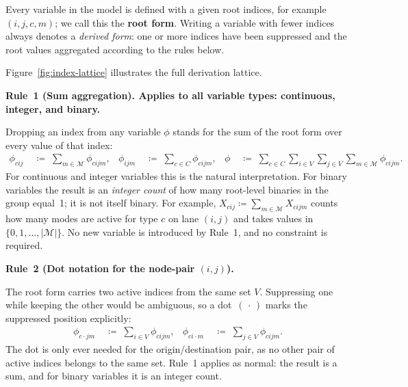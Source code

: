 \begin{convention}
\label{conv:notation}

Every variable in the model is defined with a given root indices, for example $(i,j,c,m)$; we call this the \textbf{root form}.
Writing a variable with fewer indices always denotes a
\emph{derived form}: one or more indices have been suppressed and
the root values aggregated according to the rules below.


Figure~\ref{fig:index-lattice} illustrates the full derivation
lattice.

\medskip
\noindent\textbf{Rule~1 (Sum aggregation).
  Applies to all variable types: continuous, integer, and binary.}

Dropping an index from any variable $\phi$ stands for the sum of
the root form over every value of that index:
%
\begin{align*}
  \phi_{cij}
    &\;\coloneqq\; \sum_{m\in\mathcal{M}} \phi_{cijm},
  &
  \phi_{ijm}
    &\;\coloneqq\; \sum_{c\in C}           \phi_{cijm},
  &
  \phi
    &\;\coloneqq\;
      \sum_{c\in C}\sum_{i\in V}\sum_{j\in V}\sum_{m\in\mathcal{M}} \phi_{cijm}.
\end{align*}
%
For continuous and integer variables this is the natural
interpretation.
For binary variables the result is an \emph{integer count} of how
many root-level binaries in the group equal~1; it is not itself
binary.
For example, $X_{cij} \coloneqq \sum_{m\in\mathcal{M}}
X_{cijm}$ counts how many modes are active for type $c$ on
lane $(i,j)$ and takes values in $\{0,1,\dots,|\mathcal{M}|\}$.
No new variable is introduced by Rule~1, and no constraint is
required.

\medskip
\noindent\textbf{Rule~2 (Dot notation for the node-pair $(i,j)$).}

The root form carries two active indices from the same set $V$.
Suppressing one while keeping the other would be ambiguous, so a
dot~$(\,\cdot\,)$ marks the suppressed position explicitly:
%
\begin{align*}
  \phi_{c\cdot j m}
    &\;\coloneqq\; \sum_{i\in V} \phi_{cijm},
  &
  \phi_{ci \cdot m}
    &\;\coloneqq\; \sum_{j\in V} \phi_{cijm}.
\end{align*}
%
The dot is only ever needed for the origin/destination pair, as no
other pair of active indices belongs to the same set.
Rule~1 applies as normal: the result is a sum, and for binary
variables it is an integer count.


\end{convention}
